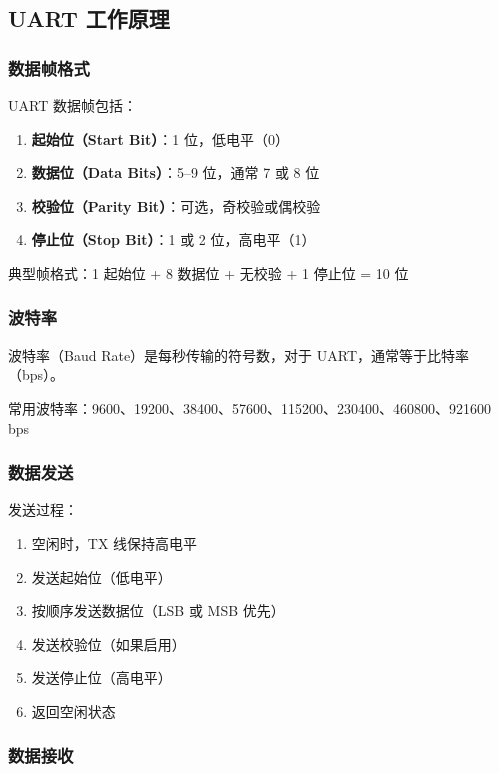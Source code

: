 \subsection{UART 工作原理}

\subsubsection{数据帧格式}

UART 数据帧包括：
\begin{enumerate}
  \item \textbf{起始位（Start Bit）}：1 位，低电平（0）
  \item \textbf{数据位（Data Bits）}：5--9 位，通常 7 或 8 位
  \item \textbf{校验位（Parity Bit）}：可选，奇校验或偶校验
  \item \textbf{停止位（Stop Bit）}：1 或 2 位，高电平（1）
\end{enumerate}

典型帧格式：1 起始位 + 8 数据位 + 无校验 + 1 停止位 = 10 位

\subsubsection{波特率}

波特率（Baud Rate）是每秒传输的符号数，对于 UART，通常等于比特率（bps）。

常用波特率：9600、19200、38400、57600、115200、230400、460800、921600 bps

\subsubsection{数据发送}

发送过程：
\begin{enumerate}
  \item 空闲时，TX 线保持高电平
  \item 发送起始位（低电平）
  \item 按顺序发送数据位（LSB 或 MSB 优先）
  \item 发送校验位（如果启用）
  \item 发送停止位（高电平）
  \item 返回空闲状态
\end{enumerate}

\subsubsection{数据接收}

